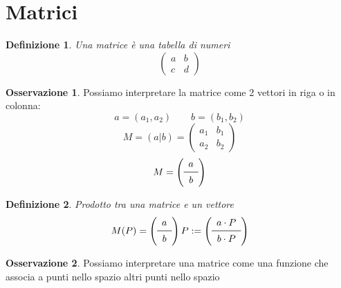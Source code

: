 \documentclass[10pt,a4paper]{article}
\theoremstyle{plain}
\newtheorem{definizione}{Definizione}
\theoremstyle{definition}
\newtheorem{osservazione}{Osservazione}
\begin{document}
	\section{Matrici}
	\begin{definizione}
		Una matrice è una tabella di numeri
		\[\begin{pmatrix}
			a & b \\
			c & d
		\end{pmatrix}\]
	\end{definizione}
	\begin{osservazione}
		Possiamo interpretare la matrice come 2 vettori in riga o in colonna:
		\[
		a=(a_1,a_2) \qquad b=(b_1,b_2)
		\]
		\[
		M=(a|b)=
		\begin{pmatrix}
		a_1 & b_1 \\
		a_2 & b_2
		\end{pmatrix}
		\]
		\[
		M=
		\left(
		\begin{array}{cc}
		a\\ \midrule
		b
		\end{array}
		\right)
		\]
	\end{osservazione}
	\begin{definizione}
		Prodotto tra una matrice e un vettore
		\[
		M(P)= \left(
		\begin{array}{cc}
		a\\ \midrule
		b
		\end{array}
		\right)
		P
		:=
		\left(
		\begin{array}{cc}
		a \cdot P\\ \midrule
		b \cdot P
		\end{array}
		\right)
		\]
	\end{definizione}
	\begin{osservazione}
		Possiamo interpretare una matrice come una funzione che associa a punti nello spazio altri punti nello spazio
	\end{osservazione}
\end{document}
